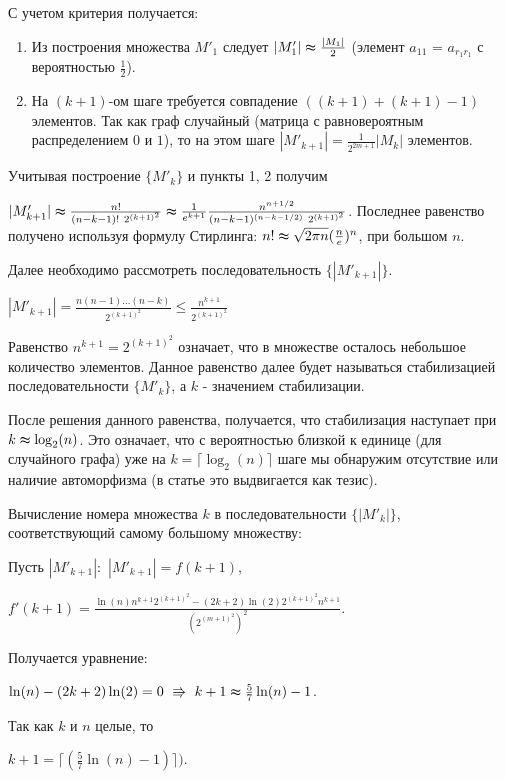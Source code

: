 С учетом критерия получается:

\begin{enumerate}
\item Из построения множества $M'_1$ следует $|M'_1|\thickapprox\frac{|M_1|}{2}$ (элемент $a_{11}$ = $a_{r_1r_1}$ с вероятностью $\frac{1}{2}$).
\item На $(k+1)$-ом шаге требуется совпадение $((k+1) + (k+1) - 1)$ элементов. Так как граф случайный (матрица с равновероятным распределением $0$ и $1$), то на этом шаге $|M'_{k+1}| = \frac{1}{2^{2m+1}}|M_k|$ элементов.
\end{enumerate}

 Учитывая построение $\{M'_k\}$ и пункты 1, 2 получим
 
 $|M'_{k+1}| \thickapprox \frac{n!}{(n-k-1)!~2^{(k+1)^2}} \thickapprox \frac{1}{e^{k+1}} \frac{n^{n+1/2}}{(n-k-1)^{(n-k-1/2)}~2^{(k+1)^2}}$. Последнее равенство получено используя формулу Стирлинга: $n!\thickapprox \sqrt{2\pi n}(\frac{n}{e})^n$, при большом $n$.
 


Далее необходимо рассмотреть последовательность $\{|M'_{k+1}|\}$. 

$|M'_{k+1}| = \frac{n(n-1)\ldots(n-k)}{2^{(k+1)^2}} \le \frac{n^{k+1}}{2^{(k+1)^2}}$

Равенство $n^{k+1} = 2^{(k+1)^2}$ означает, что в множестве осталось небольшое количество элементов. Данное равенство далее будет называться стабилизацией последовательности $\{M'_k\}$, а $k$ - значением стабилизации.

После решения данного равенства, получается, что стабилизация наступает при $k \thickapprox \log _2(n) $.
Это означает, что с вероятностью близкой к единице (для случайного графа) уже на $k = \lceil\log _2(n) \rceil$ шаге мы обнаружим отсутствие или наличие автоморфизма (в статье это выдвигается как тезис).

Вычисление номера множества $k$ в последовательности $\{|M'_{k}|\}$, соответствующий самому большому множеству:

Пусть $|M'_{k+1}|:$ $|M'_{k+1}| = f(k+1)$, 

$f'(k+1) = \frac{\ln(n)n^{k+1}2^{(k+1)^2}-(2k+2)\ln(2)2^{(k+1)^2}n^{k+1}}{(2^{(m+1)^2})^2}$. 

Получается уравнение:

$\ln(n) - (2k+2)\ln(2) = 0\ \Rrightarrow \  k+1 \thickapprox \frac{5}{7}\ln(n) - 1$. 

Так как $k$ и $n$ целые, то 

$k + 1 = \lceil(\frac{5}{7}\ln(n) - 1)\rceil)$.

